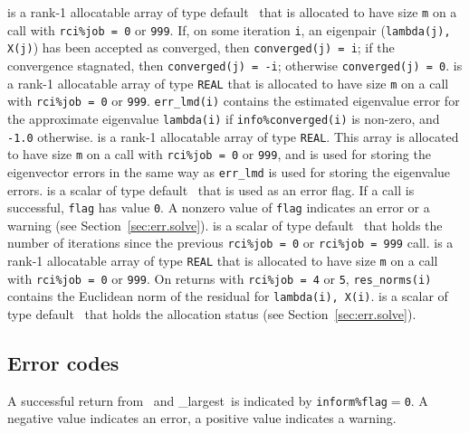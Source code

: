 \begin{description}
%
 is a rank-1 allocatable array of type 
default \Integer\ that is allocated to have size {\tt m} 
on a call with {\tt rci\%job = 0} or {\tt 999}.
If, on some iteration {\tt i}, an eigenpair ({\tt lambda(j), X(j)})
has been accepted as converged, then {\tt converged(j) = i}; 
if the convergence stagnated, then {\tt converged(j) = -i}; 
otherwise {\tt converged(j) = 0}.
%
%
 is a rank-1 allocatable array of type 
{\tt REAL} that is allocated to have size {\tt m} 
on a call with {\tt rci\%job = 0} or {\tt 999}.
{\tt err\_lmd(i)} contains 
the estimated eigenvalue error
for the approximate eigenvalue {\tt lambda(i)}
if {\tt info\%converged(i)} is non-zero,
and {\tt -1.0} otherwise.
%
 is a rank-1 allocatable array of type {\tt REAL}.
This array is allocated to have size {\tt m} 
on a call with {\tt rci\%job = 0} or {\tt 999},
and is used for storing the eigenvector errors
in the same way as {\tt err\_lmd} is used
for storing the eigenvalue errors.
%
 is a scalar of type default \Integer\ 
that is used as an error flag.
If a call is successful, {\tt flag} has value {\tt 0}.
A nonzero value of {\tt flag} indicates an error or a warning
(see Section~\ref{sec:err.solve}).
%
 is a scalar of type default \Integer\
that holds the number of iterations 
since the previous {\tt rci\%job = 0} or {\tt rci\%job = 999} call.
%
\itt{residual\_norms} is a rank-1 allocatable array of type
{\tt REAL} that is allocated to have size {\tt m} 
on a call with {\tt rci\%job = 0} or {\tt 999}.
On returns with 
{\tt rci\%job = 4} or {\tt 5}, {\tt res\_norms(i)} 
contains the Euclidean norm of the residual
for {\tt lambda(i), X(i)}.
%
is a scalar of type default \Integer\ 
that holds the allocation status
(see Section~\ref{sec:err.solve}).
%
\end{description}

\subsection{Error codes}

\label{sec:err}

A successful return from 
\solver\ and
\solver\_largest\
is indicated 
by {\tt inform\%flag$=$0}.
A negative value indicates an error, a positive value indicates a warning.

